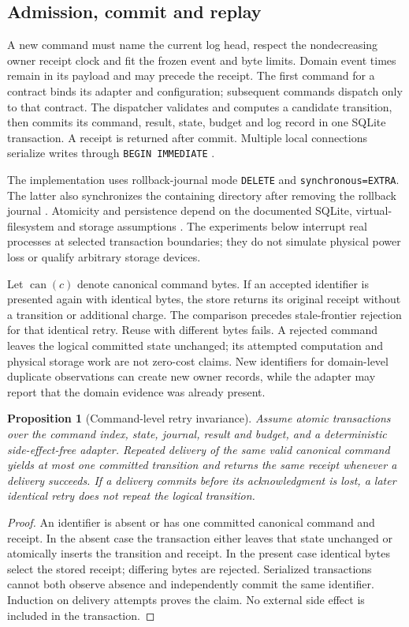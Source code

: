 \documentclass[11pt,a4paper]{article}
\newtheorem{proposition}[theorem]{Proposition}
\theoremstyle{definition}\newtheorem{definition}[theorem]{Definition}
\begin{document}
\subsection{Admission, commit and replay}
A new command must name the current log head, respect the nondecreasing owner receipt clock and fit the frozen event and byte limits. Domain event times remain in its payload and may precede the receipt. The first command for a contract binds its adapter and configuration; subsequent commands dispatch only to that contract. The dispatcher validates and computes a candidate transition, then commits its command, result, state, budget and log record in one SQLite transaction. A receipt is returned after commit. Multiple local connections serialize writes through \texttt{BEGIN IMMEDIATE} \cite{sqlitetransactions}.

The implementation uses rollback-journal mode \texttt{DELETE} and \texttt{synchronous=EXTRA}. The latter also synchronizes the containing directory after removing the rollback journal \cite{sqlitepragmas}. Atomicity and persistence depend on the documented SQLite, virtual-filesystem and storage assumptions \cite{sqliteatomic}. The experiments below interrupt real processes at selected transaction boundaries; they do not simulate physical power loss or qualify arbitrary storage devices.

Let $\operatorname{can}(c)$ denote canonical command bytes. If an accepted identifier is presented again with identical bytes, the store returns its original receipt without a transition or additional charge. The comparison precedes stale-frontier rejection for that identical retry. Reuse with different bytes fails. A rejected command leaves the logical committed state unchanged; its attempted computation and physical storage work are not zero-cost claims. New identifiers for domain-level duplicate observations can create new owner records, while the adapter may report that the domain evidence was already present.

\begin{proposition}[Command-level retry invariance]\label{prop:runtimeretry}
Assume atomic transactions over the command index, state, journal, result and budget, and a deterministic side-effect-free adapter. Repeated delivery of the same valid canonical command yields at most one committed transition and returns the same receipt whenever a delivery succeeds. If a delivery commits before its acknowledgment is lost, a later identical retry does not repeat the logical transition.
\end{proposition}
\begin{proof}
An identifier is absent or has one committed canonical command and receipt. In the absent case the transaction either leaves that state unchanged or atomically inserts the transition and receipt. In the present case identical bytes select the stored receipt; differing bytes are rejected. Serialized transactions cannot both observe absence and independently commit the same identifier. Induction on delivery attempts proves the claim. No external side effect is included in the transaction.
\end{proof}
\end{document}
